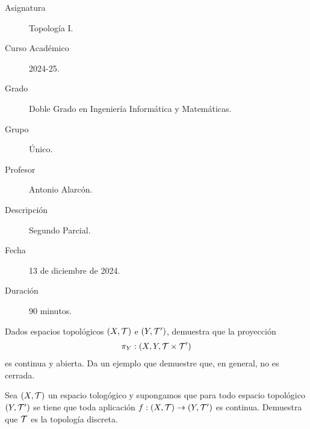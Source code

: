 \documentclass[12pt]{article}
\begin{document}

    
    

    \begin{description}
        \item[Asignatura] Topología I.
        \item[Curso Académico] 2024-25.
        \item[Grado] Doble Grado en Ingeniería Informática y Matemáticas.
        \item[Grupo] Único.
        \item[Profesor] Antonio Alarcón.
        \item[Descripción] Segundo Parcial.
        \item[Fecha] 13 de diciembre de 2024.
        \item[Duración] 90 minutos.
    
    \end{description}
    \newpage

    \begin{ejercicio}[3 puntos]
        Dados espacios topológicos $(X, \mathcal{T})$ e $(Y, \mathcal{T}')$, demuestra que la proyección 
        \begin{align*}
            \pi_Y : (X, Y, \mathcal{T}\times \mathcal{T}')
        \end{align*}
        es continua y abierta. Da un ejemplo que demuestre que, en general, no es cerrada.
    \end{ejercicio}

    \begin{ejercicio}[3 puntos]
        Sea $(X, \mathcal{T})$ un espacio tologógico y supongamos que para todo espacio topológico $(Y, \mathcal{T}')$ se tiene que toda aplicación $f:(X, \mathcal{T})\to (Y, \mathcal{T}')$ es continua. Demuestra que $\mathcal{T}$ es la topología discreta.
    \end{ejercicio}
    
\end{document}
